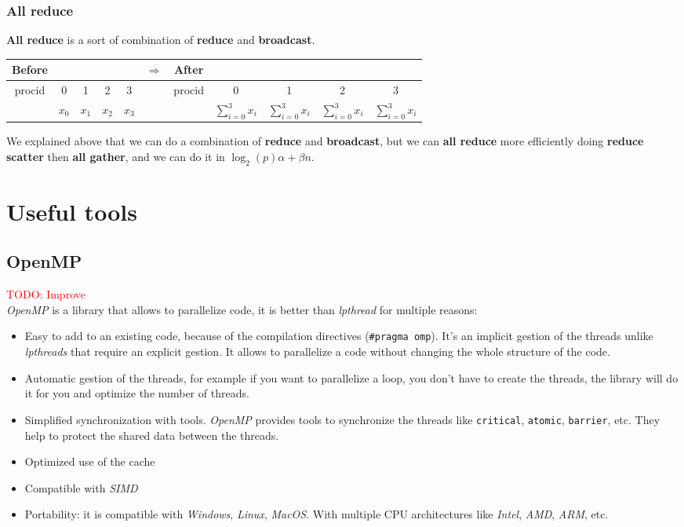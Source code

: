 \documentclass[12pt, openany]{report}
\theoremstyle{definition}
\begin{document}
\subsection{All reduce}
\textbf{All reduce} is a sort of combination of \textbf{reduce} and \textbf{broadcast}.\\
\begin{center}
	\begin{tabular}{ccccc|c|ccccc}
		Before &&&&& $\Longrightarrow$ &After&&&&\\
		\hline
		procid & 0 & 1 & 2 & 3 & & procid & 0 & 1 & 2 & 3\\
		\hline
		& $x_0$ & $x_1$ & $x_2$ & $x_3$ && & $\displaystyle \sum_{i=0}^{3} x_i$ & $\displaystyle \sum_{i=0}^{3} x_i$ & $\displaystyle \sum_{i=0}^{3} x_i$ & $\displaystyle \sum_{i=0}^{3} x_i$\\
		\hline
	\end{tabular}
\end{center}
We explained above that we can do a combination of \textbf{reduce} and \textbf{broadcast}, but we can \textbf{all reduce} more efficiently doing \textbf{reduce scatter} then \textbf{all gather}, and we can do it in $\log_2(p)\alpha + \beta n$.
\chapter{Useful tools}
\section{OpenMP}\label{OpenMP}
\textcolor{red}{TODO: Improve}\\
\textit{OpenMP} is a library that allows to parallelize code, it is better than \textit{lpthread} for multiple reasons:
\begin{itemize}
	\item Easy to add to an existing code, because of the compilation directives (\texttt{\#pragma omp}). It's an implicit gestion of the threads unlike \textit{lpthreads} that require an explicit gestion. It allows to parallelize a code without changing the whole structure of the code.
	\item Automatic gestion of the threads, for example if you want to parallelize a loop, you don't have to create the threads, the library will do it for you and optimize the number of threads.
	\item Simplified synchronization with tools. \textit{OpenMP} provides tools to synchronize the threads like \texttt{critical}, \texttt{atomic}, \texttt{barrier}, etc. They help to protect the shared data between the threads.
	\item Optimized use of the cache
	\item Compatible with \textit{SIMD}
	\item Portability: it is compatible with \textit{Windows}, \textit{Linux}, \textit{MacOS}. With multiple CPU architectures like \textit{Intel}, \textit{AMD}, \textit{ARM}, etc.
\end{itemize}
\end{document}

